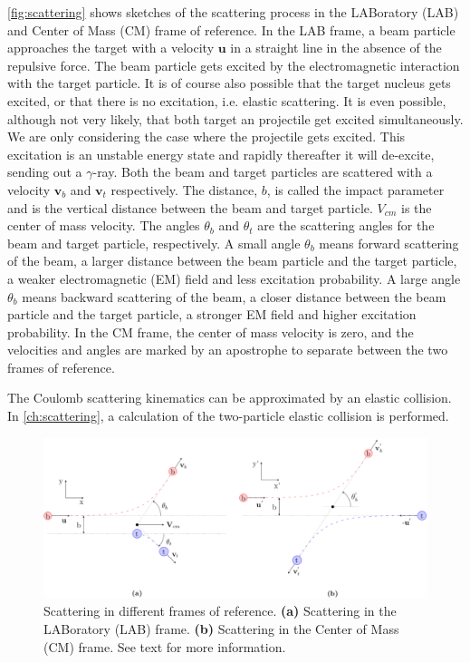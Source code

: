 \documentclass[twoside,english]{uiofysmaster/uiofysmaster}
\newcommand{\ga}{$\gamma$}
\let\orgautoref\autoref
\renewcommand{\autoref}
        {%
		 \def\sectionautorefname{Section}%
		 \def\subsectionautorefname{Section}%
		 \def\subsubsectionautorefname{Section}%
		 \def\chapterautorefname{Chapter}%
          \orgautoref}
\begin{document}
\autoref{fig:scattering} shows sketches of the scattering process in the LABoratory (LAB) and Center of Mass (CM) frame of reference. 
In the LAB frame, a beam particle approaches the target with a velocity $\mathbf{u}$ in a straight line in the absence of the repulsive force. 
The beam particle gets excited by the electromagnetic interaction with the target particle. 
It is of course also possible that the target nucleus gets excited, or that there is no excitation, i.e. elastic scattering. 
It is even possible, although not very likely, that both target an projectile get excited simultaneously.
We are only considering the case where the projectile gets excited.
This excitation is an unstable energy state and rapidly thereafter it will de-excite, sending out a \ga-ray.
Both the beam and target particles are scattered with a velocity $\mathbf{v}_b$ and $\mathbf{v}_t$ respectively.
The distance, $b$, is called the impact parameter and is the vertical distance between the beam and target particle. 
$V_{cm}$ is the center of mass velocity. 
The angles $\theta_b$ and $\theta_t$ are the scattering angles for the beam and target particle, respectively. 
A small angle $\theta_b$ means forward scattering of the beam, a larger distance between the beam particle and the target particle, a weaker electromagnetic (EM) field and less excitation probability. 
A large angle $\theta_b$ means backward scattering of the beam, a closer distance between the beam particle and the target particle, a stronger EM field and higher excitation probability.
In the CM frame, the center of mass velocity is zero, and the velocities and angles are marked by an apostrophe to separate between the two frames of reference.

The Coulomb scattering kinematics can be approximated by an elastic collision.
In \autoref{ch:scattering}, a calculation of the two-particle elastic collision is performed.

\begin{figure}[htb]
	\centering
	\includegraphics[width=\textwidth]{Images/scattering.png}
	\caption{Scattering in different frames of reference.
	\textbf{(a)} Scattering in the LABoratory (LAB) frame. 
	\textbf{(b)} Scattering in the Center of Mass (CM) frame. 
	See text for more information.}
	\label{fig:scattering}
\end{figure}
\end{document}
